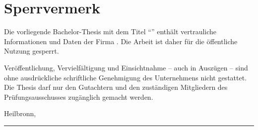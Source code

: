 \chapter*{Sperrvermerk}

Die vorliegende Bachelor-Thesis mit dem Titel \enquote{\ThesisTitel}
enthält vertrauliche Informationen und Daten der Firma \ThesisUnternehmen.
Die Arbeit ist daher für die öffentliche Nutzung gesperrt.

Veröffentlichung, Vervielfältigung und Einsichtnahme – auch in Auszügen – sind
ohne ausdrückliche schriftliche Genehmigung des Unternehmens nicht gestattet.
Die Thesis darf nur den Gutachtern und den zuständigen Mitgliedern des
Prüfungsausschusses zugänglich gemacht werden.

\vspace{2cm}
\noindent
Heilbronn, \ThesisDatum
\hfill
\begin{minipage}{6cm}
  \centering
  \rule{5.5cm}{0.4pt}\\[0.2cm]
  \ThesisAutor
\end{minipage}

\cleardoublepage

